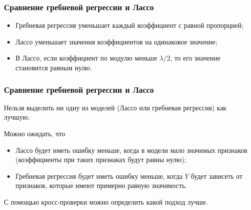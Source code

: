 \documentclass[unicode, notheorems]{beamer}
\begin{document}
\begin{frame}
\frametitle{Сравнение гребневой регрессии и Лассо}
\vspace{-0.3cm}

\begin{figure}
\end{figure}
\vspace{-0.3cm}

\begin{itemize}
\item Гребневая регрессия уменьшает каждый коэффициент с равной пропорцией; 
\item Лассо уменьшает значения коэффициентов на одинаковое значение;
\item В Лассо, если коэффициент по модулю меньше $\lambda/2$, то его значение становится равным нулю.
\end{itemize}

\end{frame}

\begin{frame}
\frametitle{Сравнение гребневой регрессии и Лассо}

Нельзя выделить ни одну из моделей (Лассо или гребневая регрессия) как лучшую.

\vspace{0.8cm}
Можно ожидать, что 
\begin{itemize}
\item Лассо будет иметь ошибку меньше, когда в модели мало значимых признаков (коэффициенты при таких признаках будут равны нулю);
\item Гребневая регрессия будет иметь ошибку меньше, когда $Y$ будет зависеть от признаков, которые имеют примерно равную значимость. 
\end{itemize}


\vspace{0.8cm}
С помощью кросс-проверки можно определить какой подход лучше.

\end{frame}
\end{document}
